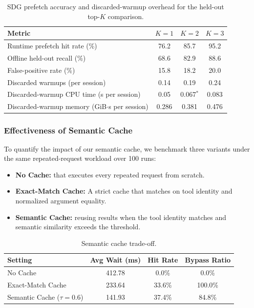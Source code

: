 \begin{table}[t]
\caption{SDG prefetch accuracy and discarded-warmup overhead for the held-out top-$K$ comparison.}
\label{tab:sdg_prefetch_accuracy_overhead}
\centering
\small
\begin{tabular}{lccc}
\toprule
Metric & $K=1$ & $K=2$ & $K=3$ \\
\midrule
Runtime prefetch hit rate (\%) & 76.2 & 85.7 & 95.2  \\
Offline held-out recall (\%) & 68.6 & 82.9 & 88.6  \\
False-positive rate (\%) & 15.8 & 18.2 & 20.0 \\
Discarded warmups (per session) & 0.14 & 0.19 & 0.24 \\
Discarded-warmup CPU time (s per session) & 0.05 & 0.067$^\ast$ & 0.083 \\
Discarded-warmup memory (GiB$\cdot$s per session) & 0.286 & 0.381 & 0.476 \\
\bottomrule
\end{tabular}
\vspace{1mm}
\end{table}

\subsubsection{Effectiveness of Semantic Cache}
\label{sec:exp:semantic_cache}

To quantify the impact of our semantic cache, we benchmark three variants under the same repeated-request workload over 100 runs:
\begin{itemize}[leftmargin=1.2em]
    \item \textbf{No Cache:} that executes every repeated request from scratch.
    \item \textbf{Exact-Match Cache:} A strict cache that matches on tool identity and normalized argument equality.
    \item \textbf{Semantic Cache:} reusing results when the tool identity matches and semantic similarity exceeds the threshold.
\end{itemize}

\begin{table}[t]
\caption{Semantic cache trade-off.}
\label{tab:semantic_cache}
\centering
\small
\begin{tabular}{lccc}
\toprule
Setting & Avg Wait (ms) & Hit Rate & Bypass Ratio \\
\midrule
No Cache & 412.78 & 0.0\% & 0.0\% \\
Exact-Match Cache & 233.64 & 33.6\% & 100.0\% \\
Semantic Cache ($\tau=0.6$) & 141.93 & 37.4\% & 84.8\% \\
\bottomrule
\end{tabular}
\vspace{-4mm}
\end{table}

